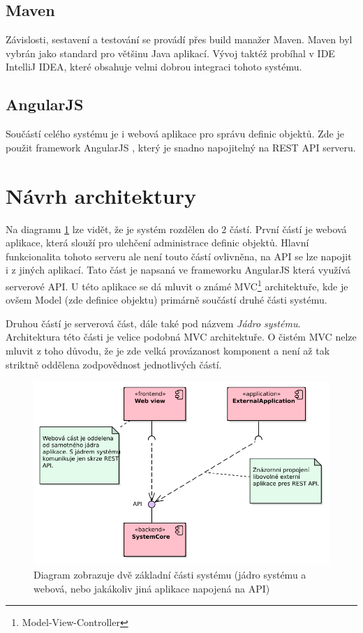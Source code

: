 \documentclass[thesis=B,czech]{FITthesis}[2012/06/26]
\begin{document}
   \subsection{Maven}
   Závislosti, sestavení a testování se provádí přes build manažer Maven. Maven byl vybrán jako standard pro většinu Java aplikací.
   Vývoj taktéž probíhal v IDE IntelliJ IDEA, které obsahuje velmi dobrou integraci tohoto systému.
   
   \subsection{AngularJS}
   Součástí celého systému je i webová aplikace pro správu definic objektů. Zde je použit framework AngularJS \cite{angular}, který je snadno napojitelný
   na REST API serveru. 

   \newpage
   
 \section{Návrh architektury}
  Na diagramu \ref{parts} lze vidět, že je systém rozdělen do 2 částí. První částí je webová aplikace, která slouží pro ulehčení administrace definic objektů.
  Hlavní funkcionalita tohoto serveru ale není touto částí ovlivněna, na API se lze napojit i z jiných aplikací.
  Tato část je napsaná ve frameworku AngularJS která využívá serverové API.
  U této aplikace se dá mluvit o známé MVC\footnote{Model-View-Controller} architektuře, kde je ovšem Model (zde definice objektu)
  primárně součástí druhé části systému.
  
  Druhou částí je serverová část, dále také pod názvem \textit{Jádro systému}. Architektura této části je velice podobná MVC architektuře. O čistém MVC nelze 
  mluvit z toho důvodu, že je zde velká provázanost komponent a není až tak striktně oddělena zodpovědnost jednotlivých částí.
  
  \begin{figure}\centering
 	\includegraphics[width=1\textwidth]{Component_Model.pdf}
 	\caption[Základní části systému]{Diagram zobrazuje dvě základní části systému (jádro systému a webová, nebo jakákoliv jiná aplikace napojená na API)}\label{parts}
 \end{figure}
  
\end{document}
